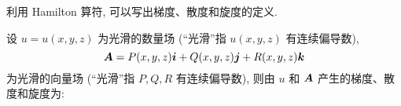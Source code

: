 利用 Hamilton 算符, 可以写出梯度、散度和旋度的定义.
\begin{definition}
    设 $u=u(x,y,z)$ 为光滑的数量场 (“光滑”指 $u(x,y,z)$ 有连续偏导数), 
    $$\vb*{A}=P(x,y,z)\vb*{i}+Q(x,y,z)\vb*{j}+R(x,y,z)\vb*{k}$$
    为光滑的向量场 (“光滑”指 $P,Q,R$ 有连续偏导数), 则由 $u$ 和 $\vb*{A}$ 产生的梯度、散度和旋度为:
\end{definition}


